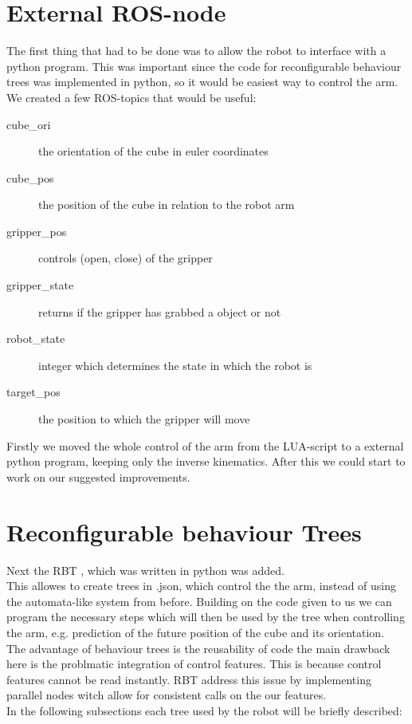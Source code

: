 \documentclass[report]{iisthesis}
\begin{document}
\section{External ROS-node}
The first thing that had to be done was to allow the robot to interface with a python program.
This was important since the code for reconfigurable behaviour trees was implemented in python, so it would be easiest way to control the 
arm.
We created a few ROS-topics that would be useful:

\begin{description}
    \item [cube\_ori] the orientation of the cube in euler coordinates 
    \item [cube\_pos] the position of the cube in relation to the robot arm
    \item [gripper\_pos] controls (open, close) of the gripper
    \item [gripper\_state] returns if the gripper has grabbed a object or not
    \item [robot\_state] integer which determines the state in which the robot is 
    \item [target\_pos] the position to which the gripper will move
\end{description}
\noindent
Firstly we moved the whole control of the arm from the LUA-script to a external python program, keeping only the inverse kinematics.
After this we could start to work on our suggested improvements. 

\section{Reconfigurable behaviour Trees}
Next the RBT \cite{DBLP:journals/corr/abs-2007-10663}, which was written in python was added. \\
This allowes to create trees in .json, which control the the arm, instead of using the automata-like system
from before.
Building on the code given to us we can program the necessary steps which will then be used by the tree when controlling the arm, e.g. prediction of
the future position of the cube and its orientation. \\
The advantage of behaviour trees is the reusability of code the main drawback here is the problmatic integration of control features. \cite{DBLP:journals/corr/abs-2007-10663}
This is because control features cannot be read instantly.
RBT address this issue by implementing parallel nodes witch allow for consistent calls on the our features. \\
In the following subsections each tree used by the robot will be briefly described:
\end{document}
